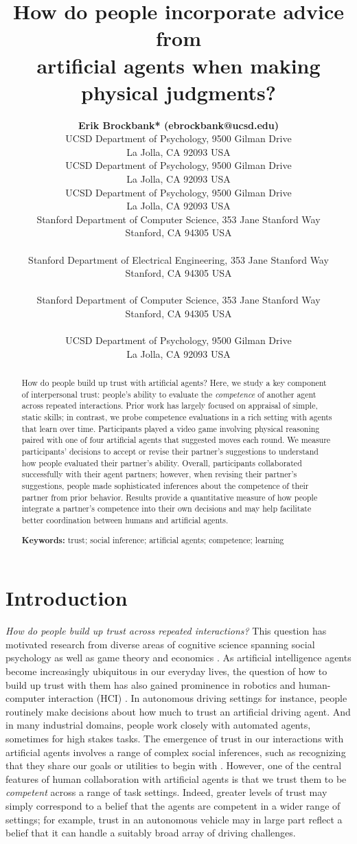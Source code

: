 \documentclass[10pt,letterpaper]{article}
\title{How do people incorporate advice from\\ artificial agents when making physical judgments?}
\author{
  {
  \large \bf Erik Brockbank* (ebrockbank@ucsd.edu)} \\
  UCSD Department of Psychology, 9500 Gilman Drive \\
  La Jolla, CA 92093 USA
  \AND {\large \bf Haoliang Wang* (haw027@ucsd.edu)} \\
  UCSD Department of Psychology, 9500 Gilman Drive \\
  La Jolla, CA 92093 USA
  \AND {\large \bf Justin Yang (juy003@ucsd.edu)} \\
  UCSD Department of Psychology, 9500 Gilman Drive \\
  La Jolla, CA 92093 USA
  \AND {\large \bf Suvir Mirchandani (suvir@cs.stanford.edu)} \\
  Stanford Department of Computer Science, 353 Jane Stanford Way \\
  Stanford, CA 94305 USA \\
  \AND {\large \bf Erdem B{\i}y{\i}k (ebiyik@stanford.edu)} \\
  Stanford Department of Electrical Engineering, 353 Jane Stanford Way \\
  Stanford, CA 94305 USA \\
  \AND {\large \bf Dorsa Sadigh (dorsa@cs.stanford.edu)} \\
  Stanford Department of Computer Science, 353 Jane Stanford Way \\
  Stanford, CA 94305 USA \\
  \AND {\large \bf Judith Fan (jefan@ucsd.edu)} \\
  UCSD Department of Psychology, 9500 Gilman Drive \\
  La Jolla, CA 92093 USA \\
}
\begin{document}
\maketitle


\begin{abstract}
How do people build up trust with artificial agents? Here, we study a key component of interpersonal trust: people's ability to evaluate the \textit{competence} of another agent across repeated interactions. Prior work has largely focused on appraisal of simple, static skills; in contrast, we probe competence evaluations in a rich setting with agents that learn over time. Participants played a video game involving physical reasoning paired with one of four artificial agents that suggested moves each round. We measure participants' decisions to accept or revise their partner's suggestions to understand how people evaluated their partner's ability. Overall, participants collaborated successfully with their agent partners; however, when revising their partner's suggestions, people made sophisticated inferences about the competence of their partner from prior behavior. Results provide a quantitative measure of how people integrate a partner's competence into their own decisions and may help facilitate better coordination between humans and artificial agents.

\textbf{Keywords:} 
trust; social inference; artificial agents; competence; learning 
\end{abstract}



\section{Introduction}

\textit{How do people build up trust across repeated interactions?} This question has motivated research from diverse areas of cognitive science spanning social psychology \cite{simpson2007psychological, deutsch1973resolution} as well as game theory and economics \cite{camerer1988experimental, berg1995trust}. As artificial intelligence agents become increasingly ubiquitous in our everyday lives, the question of how to build up trust with them has also gained prominence in robotics and human-computer interaction (HCI) \cite{soh2020multi, chen2020trust}. 
In autonomous driving settings for instance, people routinely make decisions about how much to trust an artificial driving agent. And in many industrial domains, people work closely with automated agents, sometimes for high stakes tasks. The emergence of trust in our interactions with artificial agents involves a range of complex social inferences, such as recognizing that they share our goals or utilities to begin with \cite{serrino2019finding}. However, one of the central features of human collaboration with artificial agents is that we trust them to be \textit{competent} across a range of task settings. Indeed, greater levels of trust may simply correspond to a belief that the agents are competent in a wider range of settings; for example, trust in an autonomous vehicle may in large part reflect a belief that it can handle a suitably broad array of driving challenges.
\end{document}
